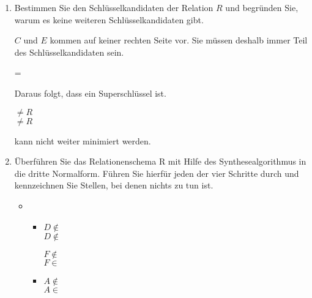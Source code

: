 \documentclass{lehramt-informatik-aufgabe}
\begin{document}
\begin{enumerate}
\item Bestimmen Sie den Schlüsselkandidaten der Relation $R$ und
begründen Sie, warum es keine weiteren Schlüsselkandidaten gibt.

\begin{liAntwort}
$C$ und $E$ kommen auf keiner rechten Seite vor. Sie müssen deshalb
immer Teil des Schlüsselkandidaten sein.

 = 

Daraus folgt, dass  ein Superschlüssel ist.

 $\neq R$\\
 $\neq R$

 kann nicht weiter minimiert werden.
\end{liAntwort}

\item Überführen Sie das Relationenschema R mit Hilfe des
Synthesealgorithmus in die dritte
Normalform. Führen Sie hierfür jeden der vier
Schritte durch und kennzeichnen Sie Stellen, bei denen nichts zu tun
ist.

\begin{liAntwort}
\begin{itemize}

\item {}

\begin{itemize}

\item {}


$D \notin$ \\
$D \notin$ 


$F \notin$ \\
$F \in$ 


\item {}


$A \notin$ \\
$A \in$ 


\end{itemize}
\end{itemize}
\end{liAntwort}
\end{enumerate}
\end{document}

